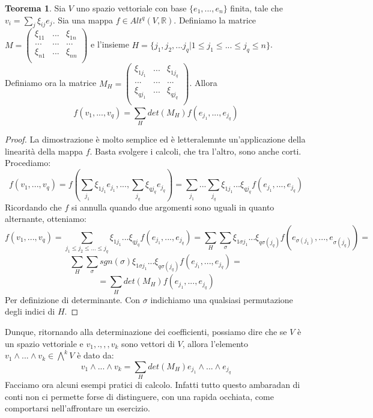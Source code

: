 \documentclass[12pt,a4paper]{report}
\theoremstyle{definition}
\theoremstyle{Theorem}
\newtheorem{Theo}[Def]{Teorema}
\theoremstyle{definition}
\theoremstyle{definition}
\theoremstyle{definition}
\begin{document}
\begin{Theo}\label{Theo 2}
	Sia $V$ uno spazio vettoriale con base $\{e_1,...,e_n\}$ finita, tale che $v_i=\sum_{j}\xi_{ij}e_j$. Sia una mappa $f\in Alt^q(V,\mathbb{R})$. Definiamo la matrice 
	$M=\begin{pmatrix}
		\xi_{11} &...& \xi_{1n}\\
		... &...& ...\\
		\xi_{n1} &...& \xi_{nn}\\
	\end{pmatrix}$ e l'insieme $H=\{j_1,j_2,...j_q|1\leq j_1\le...\le j_q\leq n\}$. Definiamo ora la matrice 
	$M_H=\begin{pmatrix}
		\xi_{1j_1} &...& \xi_{1j_q}\\
		... &...& ...\\
		\xi_{qj_1} &...& \xi_{qj_q}\\
	\end{pmatrix}$. Allora 
$$f(v_1,...,v_q)=\sum_{H}det(M_H)f(e_{j_1},...,e_{j_q})$$
\end{Theo}
\begin{proof}
	La dimostrazione è molto semplice ed è letteralemnte un'applicazione della linearità della mappa $f$. Basta svolgere i calcoli, che tra l'altro, sono anche corti. Procediamo:
	$$f(v_1,...,v_q)=f(\sum_{j_1}\xi_{1j_1}e_{j_1},...,\sum_{j_q}\xi_{qj_q}e_{j_q})=\sum_{j_1}...\sum_{j_q}\xi_{1j_1}...\xi_{qj_q}f(e_{j_1},...,e_{j_q})$$
	Ricordando che $f$ si annulla quando due argomenti sono uguali in quanto alternante, otteniamo:
	$$f(v_1,...,v_q)=\sum_{j_1\le j_2\le...\le j_q}\xi_{1j_1}...\xi_{qj_q}f(e_{j_1},...,e_{j_q})=
	\sum_{H}\sum_{\sigma}\xi_{1\sigma{j_1}}...\xi_{q\sigma(j_q)}f(e_{\sigma(j_1)},...,e_{\sigma(j_q)})=$$
	$$\sum_{H}\sum_{\sigma}sgn(\sigma)\xi_{1\sigma{j_1}}...\xi_{q\sigma(j_q)}f(e_{j_1},...,e_{j_q})=$$
	$$
	=\sum_{H}det(M_H)f(e_{j_1},...,e_{j_q})$$
	Per definizione di determinante. Con $\sigma$ indichiamo una qualsiasi permutazione degli indici di $H$.
\end{proof}
Dunque, ritornando alla determinazione dei coefficienti, possiamo dire che se $V$ è un spazio vettoriale e $v_1,.,,,v_k$ sono vettori di $V$, allora l'elemento $v_1\wedge...\wedge v_k\in \bigwedge^kV$ è dato da:
$$v_1\wedge...\wedge v_k=\sum_{H}det(M_H)e_{j_1}\wedge...\wedge e_{j_q}$$
Facciamo ora alcuni esempi pratici di calcolo. Infatti tutto questo ambaradan di conti non ci permette forse di distinguere, con una rapida occhiata, come comportarsi nell'affrontare un esercizio.
\end{document}

